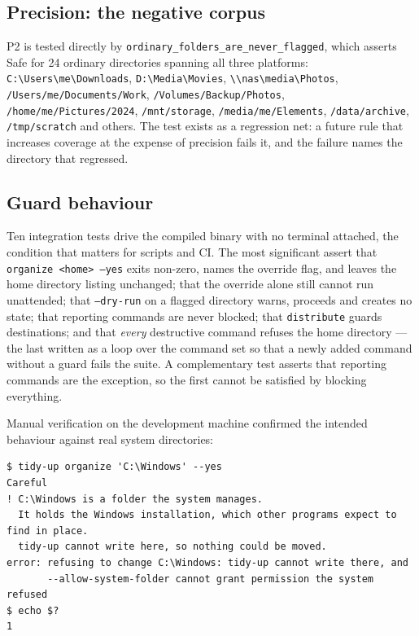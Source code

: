 \documentclass[11pt,a4paper]{article}
\newcommand{\code}[1]{\texttt{\small #1}}
\begin{document}
\subsection{Precision: the negative corpus}

P2 is tested directly by \code{ordinary\_folders\_are\_never\_flagged}, which asserts
\textsf{Safe} for 24 ordinary directories spanning all three platforms:
\code{C:\textbackslash Users\textbackslash me\textbackslash Downloads}, \code{D:\textbackslash Media\textbackslash Movies},
\code{\textbackslash\textbackslash nas\textbackslash media\textbackslash Photos}, \code{/Users/me/Documents/Work},
\code{/Volumes/Backup/Photos}, \code{/home/me/Pictures/2024}, \code{/mnt/storage},
\code{/media/me/Elements}, \code{/data/archive}, \code{/tmp/scratch} and others. The
test exists as a regression net: a future rule that increases coverage at the expense
of precision fails it, and the failure names the directory that regressed.

\subsection{Guard behaviour}

Ten integration tests drive the compiled binary with no terminal attached, the
condition that matters for scripts and CI. The most significant assert that
\code{organize <home> --yes} exits non-zero, names the override flag, and leaves the
home directory listing unchanged; that the override alone still cannot run unattended;
that \code{--dry-run} on a flagged directory warns, proceeds and creates no state; that
reporting commands are never blocked; that \code{distribute} guards destinations; and
that \emph{every} destructive command refuses the home directory --- the last written
as a loop over the command set so that a newly added command without a guard fails the
suite. A complementary test asserts that reporting commands are the exception, so the
first cannot be satisfied by blocking everything.

Manual verification on the development machine confirmed the intended behaviour
against real system directories:

\begin{lstlisting}[style=shell]
$ tidy-up organize 'C:\Windows' --yes
Careful
! C:\Windows is a folder the system manages.
  It holds the Windows installation, which other programs expect to find in place.
  tidy-up cannot write here, so nothing could be moved.
error: refusing to change C:\Windows: tidy-up cannot write there, and
       --allow-system-folder cannot grant permission the system refused
$ echo $?
1
\end{lstlisting}
\end{document}

